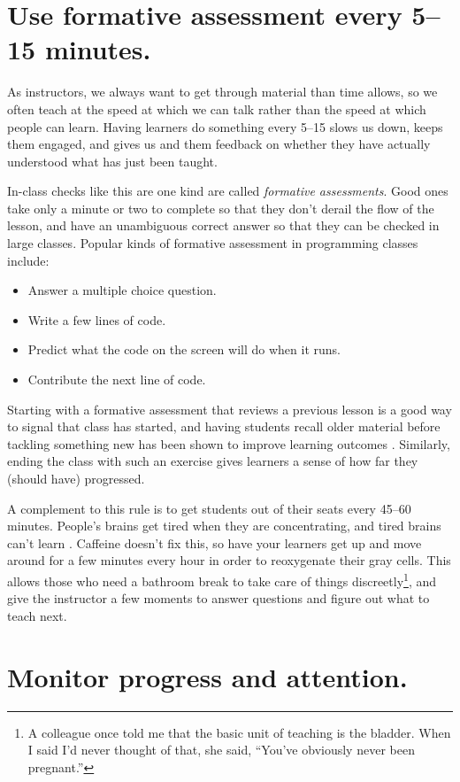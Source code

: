 \documentclass[10pt,letterpaper]{article}
\newcommand{\rulemajor}[1]{\section{#1}}
\begin{document}
\rulemajor{Use formative assessment every 5--15 minutes.}

As instructors,
we always want to get through material than time allows,
so we often teach at the speed at which we can talk
rather than the speed at which people can learn.
Having learners do something every 5--15 slows us down,
keeps them engaged,
and gives us and them feedback on whether they have actually understood
what has just been taught.

In-class checks like this are one kind are called \emph{formative assessments}.
Good ones take only a minute or two to complete so that they don't derail the flow of the lesson,
and have an unambiguous correct answer so that they can be checked in large classes.
Popular kinds of formative assessment in programming classes include:

\begin{itemize}
  \item Answer a multiple choice question.
  \item Write a few lines of code.
  \item Predict what the code on the screen will do when it runs.
  \item Contribute the next line of code.
\end{itemize}

Starting with a formative assessment that reviews a previous lesson
is a good way to signal that class has started,
and having students recall older material before tackling something new
has been shown to improve learning outcomes \cite{Wein2018b}.
Similarly,
ending the class with such an exercise
gives learners a sense of how far they (should have) progressed.

A complement to this rule is to get students out of their seats every 45--60 minutes.
People's brains get tired when they are concentrating,
and tired brains can't learn \cite{Ambr2010,HPL2}.
Caffeine doesn't fix this,
so have your learners get up and move around for a few minutes every hour
in order to reoxygenate their gray cells.
This allows those who need a bathroom break to take care of things discreetly\footnote{A colleague once told me that
the basic unit of teaching is the bladder.
When I said I'd never thought of that,
she said, ``You've obviously never been pregnant.''},
and give the instructor a few moments to answer questions
and figure out what to teach next.

\rulemajor{Monitor progress and attention.}
\end{document}
